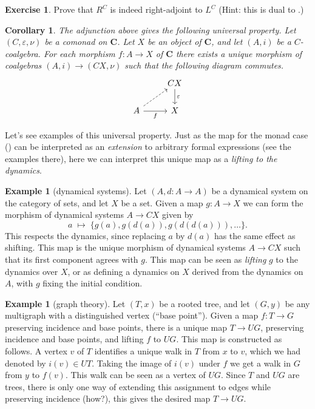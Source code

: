 \documentclass[12pt,oneside,headings=small]{scrbook}
\numberwithin{equation}{section}
\theoremstyle{plain}
\newtheorem{cor}[thm]{Corollary}
\theoremstyle{definition}
\newtheorem{eg}[thm]{Example}
\newtheorem{ex}[thm]{Exercise}
\newcommand{\cat}[1]{{\mathbf{#1}}} %
\newcommand{\ar}[2][]{\arrow{#2}{#1}}
\newcommand{\uni}[2][]{\arrow[dashrightarrow]{#2}{#1}} %
\newcommand{\e}{\varepsilon}
\DeclareMathOperator{\1}{\mathbbm{1}}
\DeclareMathOperator{\2}{\mathbbm{2}}
\begin{document}
\begin{ex}
 Prove that $R^C$ is indeed right-adjoint to $L^C$ (Hint: this is dual to .)
\end{ex}

\begin{cor}
 The adjunction above gives the following universal property. Let $(C,\e,\nu)$ be a comonad on $\cat{C}$. Let $X$ be an object of $\cat{C}$, and let $(A,i)$ be a $C$-coalgebra. For each morphism $f:A\to X$ of $\cat{C}$ there exists a unique morphism of coalgebras $(A,i)\to (CX,\nu)$ such that the following diagram commutes.
 $$
 \begin{tikzcd}
 & CX \ar{d}{\e} \\
 A \uni{ur} \ar{r}[swap]{f} & X
 \end{tikzcd}
 $$
\end{cor}

Let's see examples of this universal property. Just as the map for the monad case () can be interpreted as an \emph{extension} to arbitrary formal expressions (see the examples there), here we can interpret this unique map as a \emph{lifting to the dynamics}.

\begin{eg}[dynamical systems]
 Let $(A,d:A\to A)$ be a dynamical system on the category of sets, and let $X$ be a set. Given a map $g:A\to X$ we can form the morphism of dynamical systems $A\to CX$ given by 
 $$
 a\;\longmapsto\; \{g(a), g(d(a)), g(d(d(a))),\dots\} .
 $$
 This respects the dynamics, since replacing $a$ by $d(a)$ has the same effect as shifting. This map is the unique morphism of dynamical systems $A\to CX$ such that its first component agrees with $g$. This map can be seen as \emph{lifting} $g$ to the dynamics over $X$, or as defining a dynamics on $X$ derived from the dynamics on $A$, with $g$ fixing the initial condition.
\end{eg}

\begin{eg}[graph theory]
 Let $(T,x)$ be a rooted tree, and let $(G,y)$ be any multigraph with a distinguished vertex (``base point''). Given a map $f:T\to G$ preserving incidence and base points, there is a unique map $T\to UG$, preserving incidence and base points, and lifting $f$ to $UG$. This map is constructed as follows. A vertex $v$ of $T$ identifies a unique walk in $T$ from $x$ to $v$, which we had denoted by $i(v)\in UT$. Taking the image of $i(v)$ under $f$ we get a walk in $G$ from $y$ to $f(v)$. This walk can be seen as a vertex of $UG$. Since $T$ and $UG$ are trees, there is only one way of extending this assignment to edges while preserving incidence (how?), this gives the desired map $T\to UG$. 
\end{eg}
\end{document}
